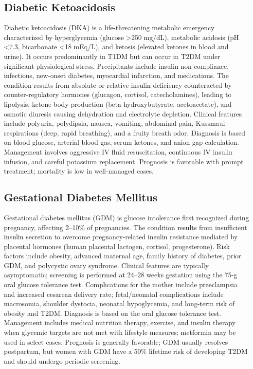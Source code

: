 \subsection{Diabetic Ketoacidosis}
\label{sec:Diabetic Ketoacidosis}
Diabetic ketoacidosis (DKA) is a life-threatening metabolic emergency characterized by hyperglycemia (glucose >250 mg/dL), metabolic acidosis (pH <7.3, bicarbonate <18 mEq/L), and ketosis (elevated ketones in blood and urine). It occurs predominantly in T1DM but can occur in T2DM under significant physiological stress. Precipitants include insulin non-compliance, infections, new-onset diabetes, myocardial infarction, and medications. The condition results from absolute or relative insulin deficiency counteracted by counter-regulatory hormones (glucagon, cortisol, catecholamines), leading to lipolysis, ketone body production (beta-hydroxybutyrate, acetoacetate), and osmotic diuresis causing dehydration and electrolyte depletion. Clinical features include polyuria, polydipsia, nausea, vomiting, abdominal pain, Kussmaul respirations (deep, rapid breathing), and a fruity breath odor. Diagnosis is based on blood glucose, arterial blood gas, serum ketones, and anion gap calculation. Management involves aggressive IV fluid resuscitation, continuous IV insulin infusion, and careful potassium replacement. Prognosis is favorable with prompt treatment; mortality is low in well-managed cases.

\subsection{Gestational Diabetes Mellitus}
\label{sec:Gestational Diabetes Mellitus}
Gestational diabetes mellitus (GDM) is glucose intolerance first recognized during pregnancy, affecting 2--10\% of pregnancies. The condition results from insufficient insulin secretion to overcome pregnancy-related insulin resistance mediated by placental hormones (human placental lactogen, cortisol, progesterone). Risk factors include obesity, advanced maternal age, family history of diabetes, prior GDM, and polycystic ovary syndrome. Clinical features are typically asymptomatic; screening is performed at 24--28 weeks gestation using the 75-g oral glucose tolerance test. Complications for the mother include preeclampsia and increased cesarean delivery rate; fetal/neonatal complications include macrosomia, shoulder dystocia, neonatal hypoglycemia, and long-term risk of obesity and T2DM. Diagnosis is based on the oral glucose tolerance test. Management includes medical nutrition therapy, exercise, and insulin therapy when glycemic targets are not met with lifestyle measures; metformin may be used in select cases. Prognosis is generally favorable; GDM usually resolves postpartum, but women with GDM have a 50\% lifetime risk of developing T2DM and should undergo periodic screening.

